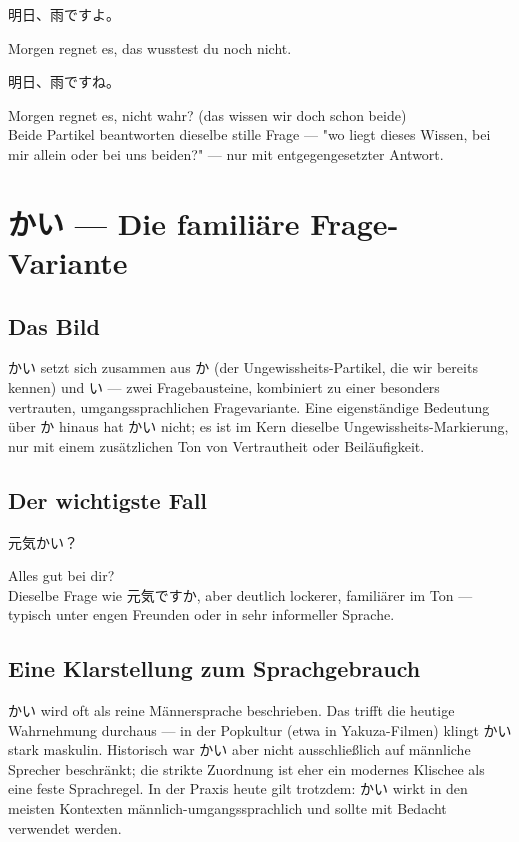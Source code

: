 \documentclass[12pt]{book}
\begin{document}
\par\quad 明日、雨ですよ。\\
\par\quad Morgen regnet es, das wusstest du noch nicht.\\

\par\quad 明日、雨ですね。\\
\par\quad Morgen regnet es, nicht wahr? (das wissen wir doch schon beide)\\

Beide Partikel beantworten dieselbe stille Frage — "wo liegt dieses Wissen, bei mir allein oder bei uns beiden?" — nur mit entgegengesetzter Antwort.


\chapter{かい — Die familiäre Frage-Variante}

\section*{Das Bild}

かい setzt sich zusammen aus か (der Ungewissheits-Partikel, die wir bereits kennen) und い — zwei Fragebausteine, kombiniert zu einer besonders vertrauten, umgangssprachlichen Fragevariante. Eine eigenständige Bedeutung über か hinaus hat かい nicht; es ist im Kern dieselbe Ungewissheits-Markierung, nur mit einem zusätzlichen Ton von Vertrautheit oder Beiläufigkeit.

\section*{Der wichtigste Fall}

\par\quad 元気かい？\\
\par\quad Alles gut bei dir?\\

Dieselbe Frage wie 元気ですか, aber deutlich lockerer, familiärer im Ton — typisch unter engen Freunden oder in sehr informeller Sprache.

\section*{Eine Klarstellung zum Sprachgebrauch}

かい wird oft als reine Männersprache beschrieben. Das trifft die heutige Wahrnehmung durchaus — in der Popkultur (etwa in Yakuza-Filmen) klingt かい stark maskulin. Historisch war かい aber nicht ausschließlich auf männliche Sprecher beschränkt; die strikte Zuordnung ist eher ein modernes Klischee als eine feste Sprachregel. In der Praxis heute gilt trotzdem: かい wirkt in den meisten Kontexten männlich-umgangssprachlich und sollte mit Bedacht verwendet werden.
\end{document}
